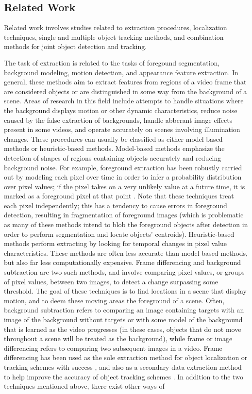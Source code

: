 \documentclass[smallcondensed, final]{svjour3}
\begin{document}
\subsection{Related Work}
\label{sec:relatedwork}


Related work involves studies related to extraction procedures, localization techniques, single and multiple object tracking methods, and combination methods for joint object detection and tracking.

The task of extraction is related to the tasks of foregound segmentation, background modeling, motion detection, and appearance feature extraction. In general, these methods aim to extract features from regions of a video frame that are considered objects or are distinguished in some way from the background of a scene. Areas of research in this field include attempts to handle situations where the background displays motion or other dynamic characteristics, reduce noise caused by the false extraction of backgrounds, handle abberant image effects present in some videos, and operate accurately on scenes involving illumination changes. These procedures can usually be classified as either model-based methods or heuristic-based methods. Model-based methods emphasize the detection of shapes of regions containing objects accurately and reducing background noise. For example, foreground extraction has been robustly carried out by modeling each pixel over time in order to infer a probability distribution over pixel values; if the pixel takes on a very unlikely value at a future time, it is marked as a foreground pixel at that point \citep{stauffer_1999, elgammal_2000, elgammal_2002}. Note that these techniques treat each pixel independently; this has a tendency to cause errors in foreground detection, resulting in fragmentation of foreground images (which is problematic as many of these methods intend to blob the foreground objects after detection in order to perform segmentation and locate objects' centroids). Heuristic-based methods perform extracting by looking for temporal changes in pixel value characteristics. These methods are often less accurate than model-based methods, but also far less computationally expensive. Frame differencing and background subtraction are two such methods, and involve comparing pixel values, or groups of pixel values, between two images, to detect a change surpassing some threshold. The goal of these techniques is to find locations in a scene that display motion, and to deem these moving areas the foreground of a scene.  Often, background subtraction refers to comparing an image containing targets with an image of the background without targets or with some model of the background that is learned as the video progresses (in these cases, objects that do not move throughout a scene will be treated as the background), while frame or image differencing refers to comparing two subsequent images in a video. Frame differencing has been used as the sole extraction method for object localization or tracking schemes with success \citep{pece_2002, beleznai_2006, chu_2007}, and also as a secondary data extraction method to help improve the accuracy of object tracking schemes \citep{perez_2002}. In addition to the two techniques mentioned above, there exist other ways of 
\end{document}

